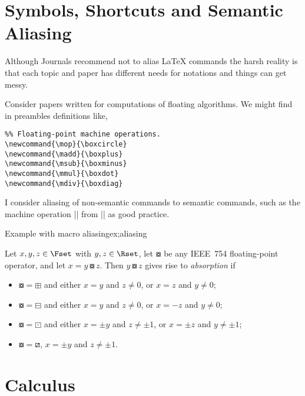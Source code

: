 {\section{Symbols, Shortcuts and Semantic Aliasing}

Although Journals recommend not to alias LaTeX commands the harsh reality is that each topic and paper has different needs for notations and things can get messy.

Consider papers written for computations of floating algorithms. We might find in preambles definitions like, 
{\parskip0pt\large
\begin{verbatim}
%% Floating-point machine operations.
\newcommand{\mop}{\boxcircle}
\newcommand{\madd}{\boxplus}
\newcommand{\msub}{\boxminus}
\newcommand{\mmul}{\boxdot}
\newcommand{\mdiv}{\boxdiag}
\end{verbatim}
}
\newcommand{\mop}{\boxcircle}
\newcommand{\madd}{\boxplus}
\newcommand{\msub}{\boxminus}
\newcommand{\mmul}{\boxdot}
\newcommand{\mdiv}{\boxdiag}

I consider aliasing of non-semantic commands to semantic commands, such as the machine operation |\mop| from |\boxcircle| as good practice. 

\begin{texexample}{Example with macro aliasing}{ex;aliasing}
\begin{Definition} 
Let $x, y, z \in \Fset$ with $y, z \in \Rset$,
let $\mathord{\mop}$ be any IEEE~754 floating-point operator,
and let $x = y \mop z$.
Then $y \mop z$ gives rise to \emph{absorption} if
\begin{itemize}
\item
$\mathord{\mop} = \mathord{\madd}$
and either $x = y$ and $z \neq 0$, or $x = z$ and $y \neq 0$;
\item
$\mathord{\mop} = \mathord{\msub}$
and either $x = y$ and $z \neq 0$, or $x = -z$ and $y \neq 0$;
\item
$\mathord{\mop} = \mathord{\mmul}$
and either $x = \pm y$ and $z \neq \pm 1$, or $x = \pm z$ and $y \neq \pm 1$;
\item
$\mathord{\mop} = \mathord{\mdiv}$,
$x = \pm y$ and $z \neq \pm 1$.
\end{itemize}
\end{Definition}
\end{texexample}

\section{Calculus}



}
